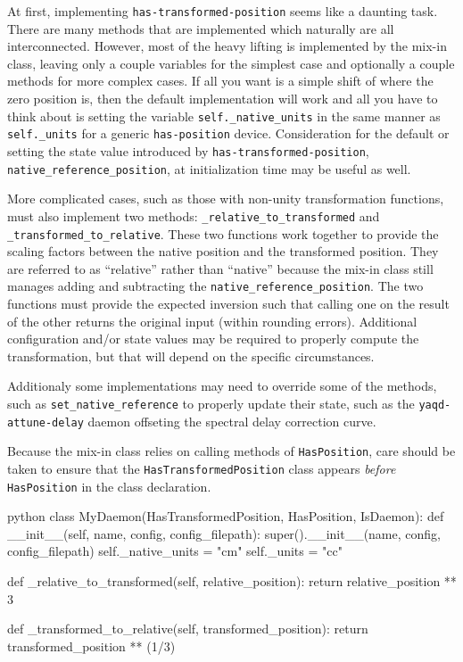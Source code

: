 At first, implementing \texttt{has-transformed-position} seems like a daunting task.
There are many methods that are implemented which naturally are all interconnected.
However, most of the heavy lifting is implemented by the mix-in class, leaving only a couple variables for the simplest case and optionally a couple methods for more complex cases.
If all you want is a simple shift of where the zero position is, then the default implementation will work and all you have to think about is setting the variable \texttt{self.\_native\_units} in the same manner as \texttt{self.\_units} for a generic \texttt{has-position} device.
Consideration for the default or setting the state value introduced by \texttt{has-transformed-position}, \texttt{native\_reference\_position}, at initialization time may be useful as well.

More complicated cases, such as those with non-unity transformation functions, must also implement two methods: \texttt{\_relative\_to\_transformed} and \texttt{\_transformed\_to\_relative}.
These two functions work together to provide the scaling factors between the native position and the transformed position.
They are referred to as ``relative'' rather than ``native'' because the mix-in class still manages adding and subtracting the \texttt{native\_reference\_position}.
The two functions must provide the expected inversion such that calling one on the result of the other returns the original input (within rounding errors).
Additional configuration and/or state values may be required to properly compute the transformation, but that will depend on the specific circumstances.

Additionaly some implementations may need to override some of the methods, such as \texttt{set\_native\_reference} to properly update their state, such as the \texttt{yaqd-attune-delay} daemon offseting the spectral delay correction curve.

Because the mix-in class relies on calling methods of \texttt{HasPosition}, care should be taken to ensure that the \texttt{HasTransformedPosition} class appears \textit{before} \texttt{HasPosition} in the class declaration.

\begin{codefragment}{python}
class MyDaemon(HasTransformedPosition, HasPosition, IsDaemon):
    def __init__(self, name, config, config_filepath):
        super().__init__(name, config, config_filepath)
        self._native_units = "cm"
        self._units = "cc"

    def _relative_to_transformed(self, relative_position):
        return relative_position ** 3

    def _transformed_to_relative(self, transformed_position):
        return transformed_position ** (1/3)
\end{codefragment}

